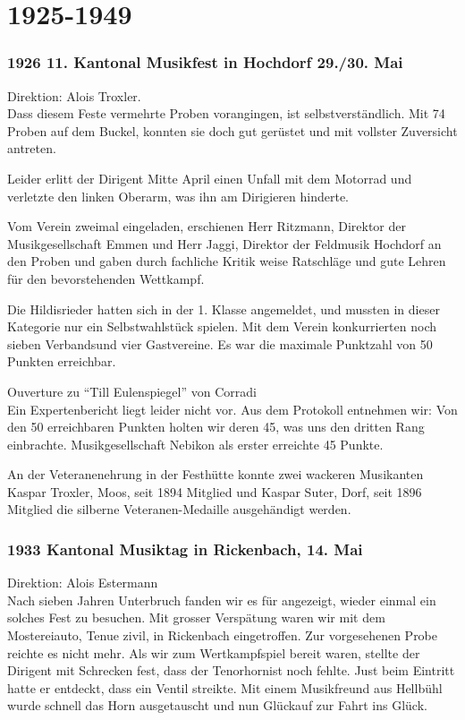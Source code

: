 \section{1925-1949}

\begin{history}

    \subsubsection{1926 11. Kantonal Musikfest in Hochdorf 29./30. Mai}

    Direktion: Alois Troxler.\\
    Dass diesem Feste vermehrte Proben vorangingen, ist selbstverständlich. Mit
    74 Proben auf dem Buckel, konnten sie doch gut gerüstet und mit vollster
    Zuversicht antreten.

    Leider erlitt der Dirigent Mitte April einen Unfall mit dem Motorrad und
    verletzte den linken Oberarm, was ihn am Dirigieren hinderte.

    Vom Verein zweimal eingeladen, erschienen Herr Ritzmann, Direktor der
    Musikgesellschaft Emmen und Herr Jaggi, Direktor der Feldmusik Hochdorf an
    den Proben und gaben durch fachliche Kritik weise Ratschläge und gute Lehren
    für den bevorstehenden Wettkampf.

    Die Hildisrieder hatten sich in der 1. Klasse angemeldet, und mussten in
    dieser Kategorie nur ein Selbstwahlstück spielen. Mit dem Verein
    konkurrierten noch sieben Verbandsund vier Gastvereine. Es war die maximale
    Punktzahl von 50 Punkten erreichbar.

    Ouverture zu \enquote{Till Eulenspiegel} von Corradi\\
    Ein Expertenbericht liegt leider nicht vor. Aus dem Protokoll entnehmen wir:
    Von den 50 erreichbaren Punkten holten wir deren 45, was uns den dritten
    Rang einbrachte. Musikgesellschaft Nebikon als erster erreichte 45 Punkte.

    An der Veteranenehrung in der Festhütte konnte zwei wackeren Musikanten
    Kaspar Troxler, Moos, seit 1894 Mitglied und Kaspar Suter, Dorf, seit 1896
    Mitglied die silberne Veteranen-Medaille ausgehändigt werden.


    \subsubsection{1933 Kantonal Musiktag in Rickenbach, 14. Mai}

    Direktion: Alois Estermann\\
    Nach sieben Jahren Unterbruch fanden wir es für angezeigt, wieder einmal ein
    solches Fest zu besuchen. Mit grosser Verspätung waren wir mit dem
    Mostereiauto, Tenue zivil, in Rickenbach eingetroffen. Zur vorgesehenen
    Probe reichte es nicht mehr. Als wir zum Wertkampfspiel bereit waren,
    stellte der Dirigent mit Schrecken fest, dass der Tenorhornist noch fehlte.
    Just beim Eintritt hatte er entdeckt, dass ein Ventil streikte. Mit einem
    Musikfreund aus Hellbühl wurde schnell das Horn ausgetauscht und nun
    Glückauf zur Fahrt ins Glück.


\end{history}
